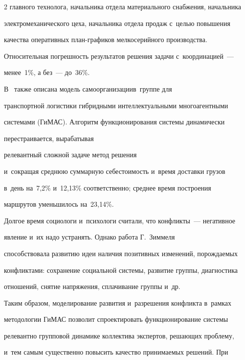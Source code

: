 \begin{multicols}{2}
главного технолога, начальника отдела материального снабжения, начальника 

электромеханического цеха, начальника отдела продаж \mbox{с~целью} повышения 

качества оперативных план-гра\-фи\-ков мелкосерийного производства. 

Относительная погрешность результатов решения задачи с~координацией~--- 

менее~1\%, а без~--- до~36\%.

  

  В~\cite{2-r} также описана модель самоорганизации\linebreak в~группе для 

транспортной логистики гибридными интеллектуальными многоагентными 

сис\-те\-ма\-ми (ГиМАС). Алгоритм функционирования сис\-те\-мы динамически 

перестраивается, вырабатывая\linebreak

 релевантный сложной задаче метод решения 

и~сокращая среднюю суммарную се\-бе\-сто\-и\-мость и~время доставки грузов 

в~день на~7,2\% и~12,13\% соответственно; среднее время по\-стро\-ения 

маршрутов уменьшилось на~23,14\%.





  

  Долгое время социологи и~психологи считали, что конфликты~--- негативное 

явление и~их надо устранять. Однако работа Г.~Зиммеля~\cite{3-r} 

способствовала развитию идеи наличия позитивных изменений, порождаемых 

конфликтами: сохранение социальной системы, развитие группы, диагностика 

отношений, снятие напряжения, сплачивание группы и~др. 

  

  Таким образом, моделирование развития и~разрешения конфликта в~рамках 

методологии ГиМАС позволит спроектировать функционирование сис\-те\-мы 

релевантно групповой динамике коллектива экспертов, решающих проб\-ле\-му, 

и~тем самым существенно повысить качество принимаемых ре\-шений. При 


\end{multicols}
